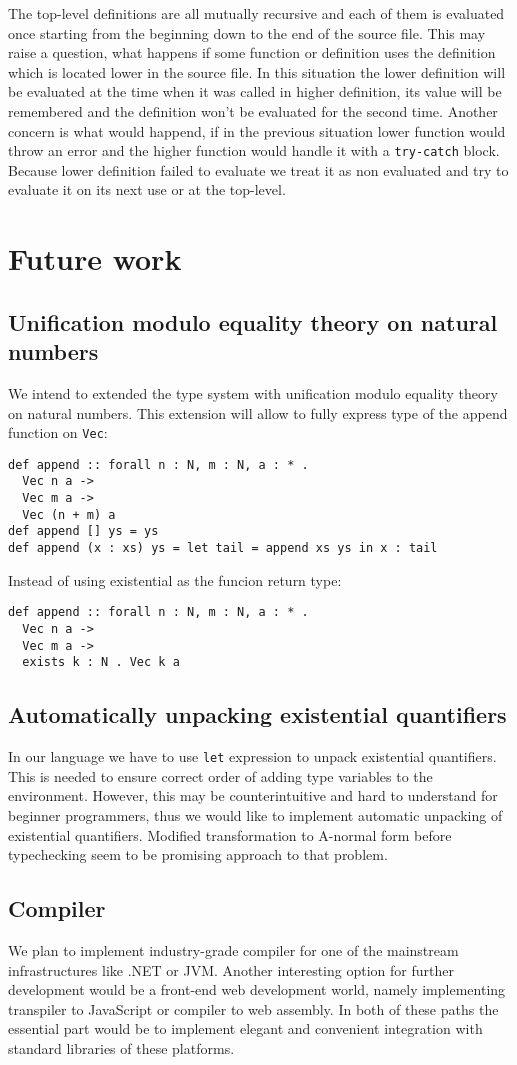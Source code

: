 \documentclass[declaration,shortabstract,english]{iithesis}
\begin{document}
The top-level definitions are all mutually recursive and each of them is evaluated once starting from the beginning
down to the end of the source file. This may raise a question, what happens if some function or definition uses the definition which is located
lower in the source file. In this situation the lower definition will be evaluated at the time when it was called in higher definition,
its value will be remembered and the definition won't be evaluated for the second time.
Another concern is what would happend, if in the previous situation lower function would throw an error and the higher function would
handle it with a \verb+try-catch+ block. Because lower definition failed to evaluate we treat it as non evaluated and try to evaluate it
on its next use or at the top-level.

\chapter{Future work}
\section{Unification modulo equality theory on natural numbers}
We intend to extended the type system with unification modulo equality theory on natural numbers.
This extension will allow to fully express type of the append function on \verb+Vec+:
\begin{verbatim}
def append :: forall n : N, m : N, a : * .
  Vec n a ->
  Vec m a ->
  Vec (n + m) a
def append [] ys = ys
def append (x : xs) ys = let tail = append xs ys in x : tail
\end{verbatim}
Instead of using existential as the funcion return type:
\begin{verbatim}
def append :: forall n : N, m : N, a : * .
  Vec n a ->
  Vec m a ->
  exists k : N . Vec k a
\end{verbatim}
\section{Automatically unpacking existential quantifiers}
In our language we have to use \verb+let+ expression to unpack existential quantifiers.
This is needed to ensure correct order of adding type variables to the environment.
However, this may be counterintuitive and hard to understand for beginner programmers, thus
we would like to implement automatic unpacking of existential quantifiers.
Modified transformation to A-normal form before typechecking seem to be promising approach to that problem.
\section{Compiler}
We plan to implement industry-grade compiler for one of the mainstream infrastructures like .NET or JVM.
Another interesting option for further development would be a front-end web development world,
namely implementing transpiler to JavaScript or compiler to web assembly.
In both of these paths the essential part would be to implement elegant and convenient integration
with standard libraries of these platforms.




\end{document}
